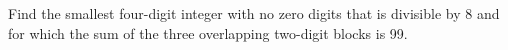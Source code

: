Find the smallest four-digit integer with no zero digits that is divisible by 8 and for which the sum of the three overlapping two-digit blocks is 99.
